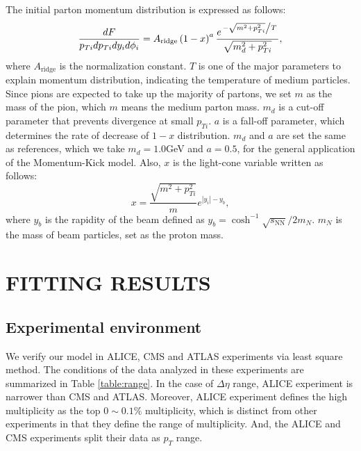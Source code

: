 \documentclass[jkps,fleqn,showpacs,showkeys]{revtex4}
\begin{document}
The initial parton momentum distribution is expressed as follows:
\begin{equation} \label{equation:eq6}
\frac{dF}{p_{Ti}dp_{Ti}dy_id\phi_i}=A_{\text{ridge}}\left(1-x\right)^a\frac{e^{ \left. -\sqrt{m^2+p_{Ti}^2} \middle/ T \right. }}{\sqrt{m_d^2+p_{Ti}^2}},
\end{equation}
where $A_{\text{ridge}}$ is the normalization constant.
$T$ is one of the major parameters to explain momentum distribution, indicating the temperature of medium particles.
Since pions are expected to take up the majority of partons, we set $m$ as the mass of the pion, which $m$ means the medium parton mass.
$m_d$ is a cut-off parameter that prevents divergence at small $p_{Ti}$.
$a$ is a fall-off parameter, which determines the rate of decrease of $1-x$ distribution.
$m_d$ and $a$ are set the same as references\cite{PbPb, Wong_1}, which we take $m_d = 1.0$GeV and $a = 0.5$, for the general application of the Momentum-Kick model\cite{Wong_1}.
Also, $x$ is the light-cone variable written as follows:
\begin{equation} \label{equation:eq8}
x=\frac{\sqrt{m^2+p_{Ti}^2}}{m}e^{\left|y_i\right|-y_b},
\end{equation}
where $y_b$ is the rapidity of the beam defined as $y_b=\cosh^{-1}{\sqrt{s_\text{NN}}/2m_N}$. $m_N$ is the mass of beam particles, set as the proton mass.


\section*{FITTING RESULTS}
\label{sec:FITTING RESULTS}

\subsection{Experimental environment}
\label{subsec:Experimental environment}

We verify our model in ALICE, CMS and ATLAS experiments\cite{alice,cms,atlas} via least square method.
The conditions of the data analyzed in these experiments are summarized in Table \ref{table:range}.
In the case of $\Delta\eta$ range, ALICE experiment is narrower than CMS and ATLAS.
Moreover, ALICE experiment defines the high multiplicity as the top $0\sim0.1\%$ multiplicity, which is distinct from other experiments in that they define the range of multiplicity.
And, the ALICE and CMS experiments split their data as $p_T$ range.
\end{document}
